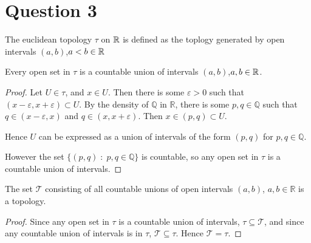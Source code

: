 \documentclass{unswmaths}
\begin{document}
\section*{Question 3}
The euclidean topology $\tau$ on $\mathbb{R}$ is defined as the toplogy generated
by open intervals $(a,b)$,$a < b \in \mathbb{R}$
\begin{lemma}
    Every open set in $\tau$ is a countable union of intervals $(a,b)$,$a,b\in \mathbb{R}$.
\end{lemma}
\begin{proof}
    Let $U \in \tau$, and $x \in U$. Then there is some $\varepsilon > 0$
    such that $(x-\varepsilon,x+\varepsilon) \subset U$. By the density
    of $\mathbb{Q}$ in $\mathbb{R}$, there is some $p,q \in \mathbb{Q}$
    such that $q \in (x-\varepsilon,x)$ and $q \in (x,x+\varepsilon)$.
    Then $x \in (p,q) \subset U$. 
    
    Hence $U$ can be expressed as a union of intervals of the form $(p,q)$
    for $p,q \in \mathbb{Q}$. 
    
    However the set $\{(p,q)\;:\;p,q \in \mathbb{Q}\}$ is countable, so
    any open set in $\tau$ is a countable union of intervals.
\end{proof} 
\begin{theorem}
    The set $\mathcal{T}$ consisting of all countable unions of open 
    intervals $(a,b)$, $a,b \in \mathbb{R}$ is a topology.
\end{theorem}   
\begin{proof}
    Since any open set in $\tau$ is a countable union of intervals, $\tau \subseteq \mathcal{T}$,
    and since any countable union of intervals is in $\tau$, $\mathcal{T} \subseteq \tau$.
    Hence $\mathcal{T} = \tau$.
\end{proof}
\end{document}

